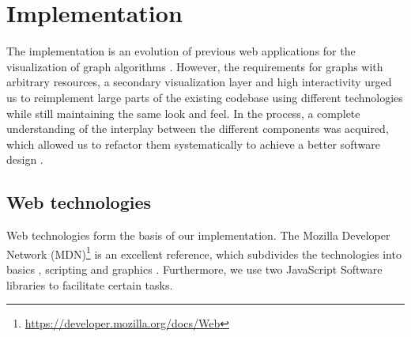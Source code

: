 \chapter{Implementation}\label{ch:5}

\newenvironment{ssfont}{\fontfamily{lmss}\selectfont}{\par}

The implementation is an evolution of previous web applications for the visualization of graph algorithms \cite{storz2013idp,velden2014idp,sefidgar2015idp,becker2015idp,zoennchen2015idp}. However, the requirements for graphs with arbitrary resources, a secondary visualization layer and high interactivity urged us to reimplement large parts of the existing codebase using different technologies  while still maintaining the same look and feel. In the process, a complete understanding of the interplay between the different components was acquired, which allowed us to refactor them systematically to achieve a better software design . %

\section{Web technologies}\label{sec:technologies}
Web technologies form the basis of our implementation. The Mozilla Developer Network (MDN)\footnote{\url{https://developer.mozilla.org/docs/Web}} is an excellent reference, which subdivides the technologies into basics , scripting  and graphics . Furthermore, we use two JavaScript Software libraries  to facilitate certain tasks.


